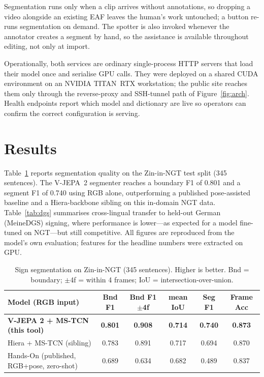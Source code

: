 \documentclass[11pt]{article}
\begin{document}
Segmentation runs only when a clip arrives without annotations, so dropping a video alongside an
existing EAF leaves the human's work untouched; a button re-runs segmentation on demand. The spotter
is also invoked whenever the annotator creates a segment by hand, so the assistance is available
throughout editing, not only at import.

Operationally, both services are ordinary single-process HTTP servers that load their model once and
serialise GPU calls. They were deployed on a shared CUDA environment on an NVIDIA TITAN~RTX
workstation; the public site reaches them only through the reverse-proxy and SSH-tunnel path of
Figure~\ref{fig:arch}. Health endpoints report which model and dictionary are live so operators can
confirm the correct configuration is serving.

\section{Results}\label{sec:results}
Table~\ref{tab:zin} reports segmentation quality on the Zin-in-NGT test split (345 sentences). The
V-JEPA~2 segmenter reaches a boundary F1 of 0.801 and a segment F1 of 0.740 using RGB alone,
outperforming a published pose-assisted baseline and a Hiera-backbone sibling on this in-domain NGT
data. Table~\ref{tab:dgs} summarises cross-lingual transfer to held-out German (MeineDGS) signing,
where performance is lower---as expected for a model fine-tuned on NGT---but still competitive. All
figures are reproduced from the model's own evaluation; features for the headline numbers were
extracted on GPU.

\begin{table}[t]
\centering
\caption{Sign segmentation on Zin-in-NGT (345 sentences). Higher is better. Bnd = boundary;
$\pm$4f = within 4 frames; IoU = intersection-over-union.}
\label{tab:zin}
\small
\begin{tabular}{lccccc}
\toprule
Model (RGB input) & Bnd F1 & Bnd F1 $\pm$4f & mean IoU & Seg F1 & Frame Acc \\
\midrule
\textbf{V-JEPA 2 + MS-TCN (this tool)} & \textbf{0.801} & \textbf{0.908} & \textbf{0.714} & \textbf{0.740} & \textbf{0.873} \\
Hiera + MS-TCN (sibling)              & 0.783 & 0.891 & 0.717 & 0.694 & 0.870 \\
Hands-On (published, RGB+pose, zero-shot) & 0.689 & 0.634 & 0.682 & 0.489 & 0.837 \\
\bottomrule
\end{tabular}
\end{table}
\end{document}

